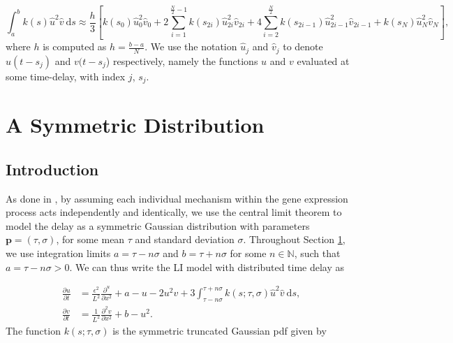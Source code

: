 \begin{equation}\label{simp}\int_{a}^{b}k(s)\hat{u}^2\hat{v}\  \text{d}s\approx\frac{h}{3}\left[k(s_0)\hat{u}^2_0\hat{v}_0+2\sum_{i=1}^{\frac{N}{2}-1}k(s_{2i})\hat{u}^2_{2i}\hat{v}_{2i}+4\sum_{i=2}^{\frac{N}{2}}k(s_{2i-1})\hat{u}^2_{2i-1}\hat{v}_{2i-1}+k(s_N)\hat{u}^2_N\hat{v}_N\right],
\end{equation}
where $h$ is computed as $h=\frac{b-a}{N}$. We use the notation $\hat{u}_j$ and $\hat{v}_j$ to denote $u(t-s_j)$ and $v(t-s_j$) respectively, namely the functions $u$ and $v$ evaluated at some time-delay, with index $j$, $s_j$.

\section{A Symmetric Distribution}\label{section:symmetric}
\subsection{Introduction}

As done in \cite{william}, by assuming each individual mechanism within the gene expression process acts independently and identically, we use the central limit theorem to model the delay as a symmetric Gaussian distribution with parameters $\textbf{p}=(\tau,\sigma)$, for some mean $\tau$ and standard deviation $\sigma$. Throughout Section \ref{section:symmetric}, we use integration limits $a=\tau-n\sigma$ and $b=\tau+n\sigma$ for some $n\in\mathbb{N}$, such that $a=\tau-n\sigma>0$. We can thus write the LI model with distributed time delay as

\begin{equation}\label{symmod}
    \begin{split}
        \frac{\partial u}{\partial t}&=\frac{\epsilon^2}{L^2}\frac{\partial^u}{\partial x^2}+a-u-2u^2v+3\int_{\tau-n\sigma}^{\tau+n\sigma}k(s;\tau,\sigma)\hat{u}^2\hat{v}\ \text{d}s,\\
        \frac{\partial v}{\partial t}&=\frac{1}{L^2}\frac{\partial^2v}{\partial x^2}+b-u^2.
    \end{split}
\end{equation}
The function $k(s;\tau,\sigma)$ is the symmetric truncated Gaussian pdf given by \cite{cite}

